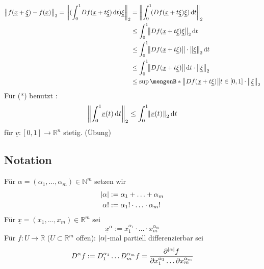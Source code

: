 \begin{align*}
	\norm[2]{f(\underline{x} + \underline{\xi}) - f(\underline{x})} = \norm[2]{\enbrace{\int_{0} ^{1} \!  D f( \underline{x} + t \underline{\xi})  \, \mathrm{d}t} \underline{\xi}} &= \norm[2]{\int_{0} ^{1} \! \enbrace{D f( \underline{x} + t \underline{\xi}) \underline{\xi} } \, \mathrm{d}t}\\
	&\le \int_{0} ^{1} \! \norm[2]{D f(\underline{x} + t \underline{\xi}) \underline{\xi} }  \, \mathrm{d}t \\
	&\le \int_{0} ^{1} \!\norm{ D f (\underline{x}+ t \underline{\xi})} \cdot \norm[2]{\underline{\xi}}  \, \mathrm{d}t \\
	&\le \int_{0} ^{1} \! \norm{D f (\underline{x} + t \underline{\xi})}  \, \mathrm{d}t \cdot  \norm[2]{\underline{\xi}} \\
	&\le \sup \set[{\norm{D f(\underline{x} + t \underline{\xi})}}]{t \in [0,1]} \cdot \norm[2]{\underline{\xi}}     
\end{align*}
Für (*) benutzt :
\[
	\norm[2]{\int_{0} ^{1} \!  \underline{v} (t)  \, \mathrm{d}t} \le \int_{0} ^{1} \! \norm[2]{\underline{v}(t)}  \, \mathrm{d}t  
\]
für $\underline{v} : [0,1] \to \mathds{R}^n$ stetig. (Übung) \bewende

\subsection[Notation für Multiindizes]{Notation} %
\label{sub:712}
Für $\alpha = (\alpha_1 , \ldots , \alpha_m) \in \mathds{N}^m$ setzen wir 
\begin{align*}
	\lvert\alpha\rvert &:= \alpha_1 + \ldots + \alpha_m \\ 
	\alpha ! &:= \alpha_1 ! \cdot \ldots \cdot \alpha_m ! \\
\end{align*}
Für $\underline{x} = (x_1, \ldots , x_m) \in \mathds{R}^m$ sei
\[
	\underline{x}^\alpha := x_1^{\alpha_1} \cdot \ldots \cdot x_m^{\alpha_m}
\]
Für $f : U \to 	\mathds{R}$ ($U \subset \mathds{R}^m$ offen): $\lvert\alpha\rvert$-mal partiell differenzierbar sei
\[
	D^\alpha f := D_1^{\alpha_1} \ldots D_m^{\alpha_m} f = \frac{\partial^{\lvert\alpha\rvert }f}{\partial x_1^{\alpha_1} \ldots \partial x_m^{\alpha_m}} 
\]

